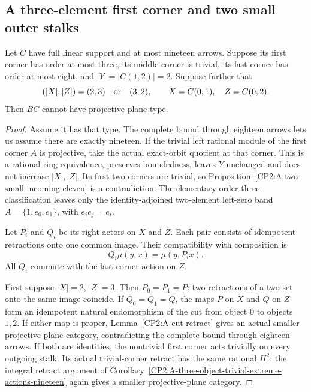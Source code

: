 \subsection{A three-element first corner and two small outer stalks}

\begin{theorem}
\label{CP2:A-linear-three-initial-two-small-stalks-nineteen}
Let $C$ have full linear support and at most nineteen arrows.
Suppose its first corner has order at most three, its middle
corner is trivial, its last corner has order at most eight,
and $|Y|=|C(1,2)|=2$.  Suppose further that
\[
 (|X|,|Z|)=(2,3)\quad\hbox{or}\quad(3,2),
 \qquad X=C(0,1),\quad Z=C(0,2).
\]
Then $BC$ cannot have projective-plane type.
\end{theorem}
\begin{proof}
Assume it has that type.  The complete bound through eighteen
arrows lets us assume there are exactly nineteen.  If the trivial left rational
module of the first corner $A$ is projective, take the
actual exact-orbit quotient at that corner.  This is a
rational ring equivalence, preserves boundedness, leaves
$Y$ unchanged and does not increase $|X|,|Z|$.  Its first
two corners are trivial, so
Proposition~\ref{CP2:A-two-small-incoming-eleven} is a
contradiction.  The elementary order-three classification
leaves only the identity-adjoined two-element left-zero
band $A=\{1,e_0,e_1\}$, with $e_ie_j=e_i$.

Let $P_i$ and $Q_i$ be its right actors on $X$ and $Z$.
Each pair consists of idempotent retractions onto one
common image.  Their compatibility with composition is
\[
 Q_i\mu(y,x)=\mu(y,P_ix).
\]
All $Q_i$ commute with the last-corner action on $Z$.

First suppose $|X|=2$, $|Z|=3$.  Then $P_0=P_1=P$:
two retractions of a two-set onto the same image coincide.
If $Q_0=Q_1=Q$, the maps $P$ on $X$ and $Q$ on $Z$
form an idempotent natural endomorphism of the cut from
object $0$ to objects $1,2$.  If either map is proper,
Lemma~\ref{CP2:A-cut-retract} gives an actual smaller
projective-plane category, contradicting the complete
bound through eighteen arrows.  If both are identities,
the nontrivial first corner acts trivially on every
outgoing stalk.  Its actual trivial-corner retract has
the same rational $H^2$; the integral retract argument
of Corollary~\ref{CP2:A-three-object-trivial-extreme-actions-nineteen}
again gives a smaller projective-plane category.


\end{proof}
